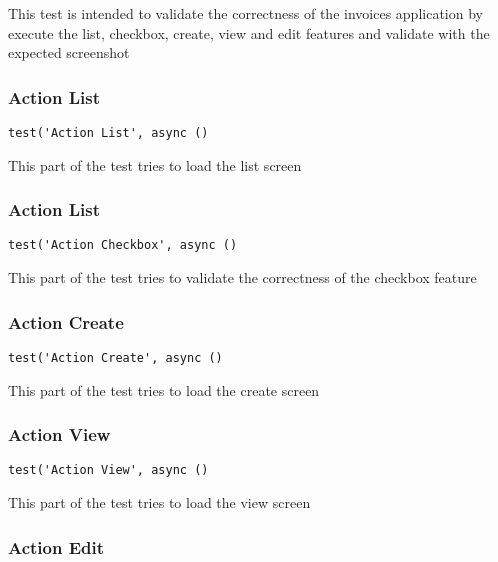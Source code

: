 \documentclass[a4paper]{article}
\begin{document}
This test is intended to validate the correctness of the invoices application
by execute the list, checkbox, create, view and edit features and validate with
the expected screenshot

\hypertarget{toc229}{}
\subsubsection{Action List}

\begin{lstlisting}
test('Action List', async ()
\end{lstlisting}

This part of the test tries to load the list screen

\hypertarget{toc230}{}
\subsubsection{Action List}

\begin{lstlisting}
test('Action Checkbox', async ()
\end{lstlisting}

This part of the test tries to validate the correctness of the checkbox
feature

\hypertarget{toc231}{}
\subsubsection{Action Create}

\begin{lstlisting}
test('Action Create', async ()
\end{lstlisting}

This part of the test tries to load the create screen

\hypertarget{toc232}{}
\subsubsection{Action View}

\begin{lstlisting}
test('Action View', async ()
\end{lstlisting}

This part of the test tries to load the view screen

\hypertarget{toc233}{}
\subsubsection{Action Edit}
\end{document}
